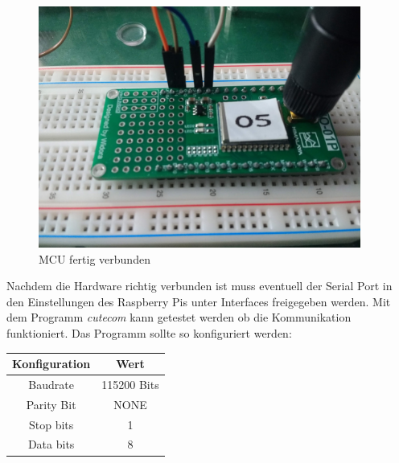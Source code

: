 \documentclass[12pt, a4paper]{article}
\begin{document}
\begin{figure}[ht!]
    \centering
    \includegraphics[width=300pt]{mcu_photo}
    \caption{MCU fertig verbunden}
\end{figure}
\clearpage
Nachdem die Hardware richtig verbunden ist muss eventuell der Serial Port 
in den Einstellungen des Raspberry Pis unter Interfaces freigegeben werden.
Mit dem Programm \textit{cutecom} kann getestet werden ob die Kommunikation
funktioniert. Das Programm sollte so konfiguriert werden:
\begin{center}
    \begin{tabular}{|c|c|}
        \hline
        Konfiguration & Wert \\ [0.5ex]
        \hline\hline
        Baudrate & 115200 Bits \\
        \hline
        Parity Bit & NONE \\
        \hline
        Stop bits & 1 \\
        \hline
        Data bits & 8 \\
        \hline
    \end{tabular}
\end{center}
\end{document}
